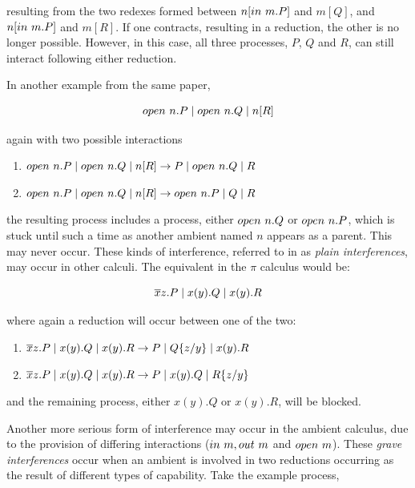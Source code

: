 \noindent resulting from the two redexes formed between
$n[in\ m.P]$ and $m[Q]$, and $n[in\ m.P]$ and $m[R]$.  If one
contracts, resulting in a reduction, the other is no longer possible.
However, in this case, all three processes, $P$, $Q$ and $R$, can
still interact following either reduction.

In another example from the same paper,

\begin{equation}
open\ n.P \;|\; open\ n.Q \;|\; n[R]
\end{equation}

\noindent again with two possible interactions

\begin{enumerate}
\item $open\ n.P \;|\; open\ n.Q \;|\; n[R] \rightarrow P \;|\; open\ n.Q \;|\; R$
\item $open\ n.P \;|\; open\ n.Q \;|\; n[R] \rightarrow
  open\ n.P \;|\; Q \;|\; R$
\end{enumerate}


\noindent the resulting process includes a process, either $open\ n.Q$
or $open\ n.P$, which is stuck until such a time as another ambient
named $n$ appears as a parent.  This may never occur.  These kinds of
interference, referred to in \cite{sangiorgi:mobsafeambients} as
\emph{plain interferences}, may occur in other calculi.  The equivalent
in the $\pi$ calculus would be:

\begin{equation}
\overline{x}z.P \;|\; x(y).Q \;|\; x(y).R
\end{equation}

\noindent where again a reduction will occur between one of the two:

\begin{enumerate}
\item $\overline{x}z.P \;|\; x(y).Q \;|\; x(y).R \rightarrow P \;|\; Q\{z/y\}
  \;|\; x(y).R$
\item $\overline{x}z.P \;|\; x(y).Q \;|\; x(y).R \rightarrow P \;|\; x(y).Q
  \;|\; R\{z/y\}$
\end{enumerate}

\noindent and the remaining process, either $x(y).Q$ or $x(y).R$, will
be blocked.

Another more serious form of interference may occur in the ambient
calculus, due to the provision of differing interactions ($in\ m,
out\ m$ and $open\ m$).  These \emph{grave interferences} occur
when an ambient is involved in two reductions occurring as the result
of different types of capability.  Take the example process,

